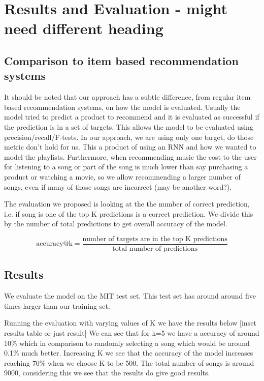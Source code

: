 \documentclass{article} %
\begin{document}
\section{Results and Evaluation - might need different heading}
\subsection{Comparison to item based recommendation systems}
It should be noted that our approach has a subtle difference, from regular item based recommendation systems, on how the model is evaluated. Usually the model tried to predict a product to recommend and it is evaluated as successful if the prediction is in a set of targets. This allows the model to be evaluated using precision/recall/F-tests. In our approach, we are using only one target, do those metric don't hold for us. This a product of using an RNN and how we wanted to model the playlists. Furthermore, when recommending music the cost to the user for listening to a song or part of the song is much lower than say purchasing a product or watching a movie, so we allow  recommending a larger number of songs, even if many of those songs are incorrect (may be another word?).

The evaluation we proposed is looking at the the number of correct prediction, i.e. if song is one of the top K predictions is a correct prediction. We divide this by the number of total predictions to get overall accuracy of the model.

\begin{equation}
\text{accuracy@k} = \frac{\text{number of targets are in the top K predictions}}{\text{total number of predictions}}
\end{equation}
\subsection{Results}

We evaluate the model on the MIT test set. This test set has around around five times larger than our training set.

Running the evaluation with varying values of K we have the results below 
[inset results table or just result] 
We can see that for k=5 we have a accuracy of around 10\% which in comparison to randomly selecting a song which would be around 0.1\% much better. Increasing K we see that the accuracy of the model increases reaching 70\% when we choose K to be 500. The total number of songs is around 9000, considering this we see that the results do give good results. 
\end{document}
